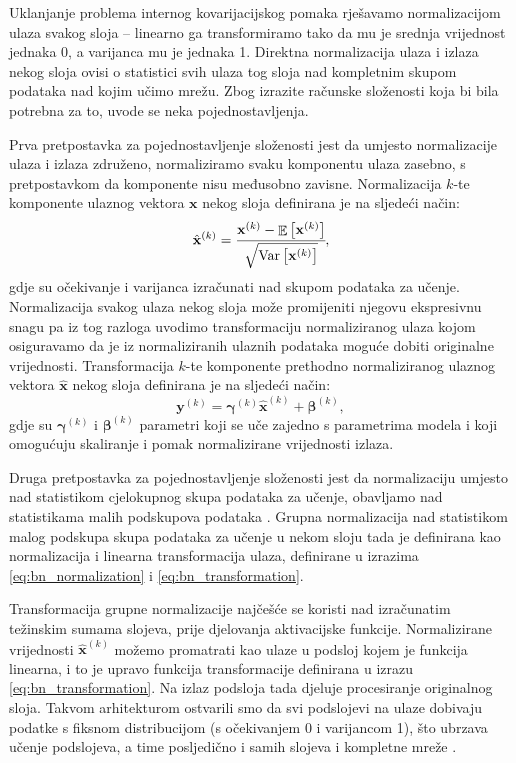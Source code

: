 \documentclass[times, utf8, diplomski, numeric]{fer}
\begin{document}
Uklanjanje problema internog kovarijacijskog pomaka rješavamo normalizacijom ulaza svakog sloja -- linearno ga transformiramo tako da mu je srednja vrijednost jednaka 0, a varijanca mu je jednaka 1.
Direktna normalizacija ulaza i izlaza nekog sloja ovisi o statistici svih ulaza tog sloja nad kompletnim skupom podataka nad kojim učimo mrežu.
Zbog izrazite računske složenosti koja bi bila potrebna za to, uvode se neka pojednostavljenja.

Prva pretpostavka za pojednostavljenje složenosti jest da umjesto normalizacije ulaza i izlaza združeno, normaliziramo svaku komponentu ulaza zasebno, s pretpostavkom da komponente nisu međusobno zavisne.
Normalizacija $k$-te komponente ulaznog vektora $\mathbf{x}$ nekog sloja definirana je na sljedeći način:
\begin{equation}
 \hat{\mathbf{x}}^{(k)} = \cfrac{\mathbf{x}^{(k)} - \mathop{\mathbb{E}} \left[ \mathbf{x}^{(k)} \right]} {\sqrt{ \mathrm{Var} \left[ \mathbf{x}^{(k)} \right] } }, \label{eq:bn_normalization}
\end{equation}
gdje su očekivanje i varijanca izračunati nad skupom podataka za učenje.
Normalizacija svakog ulaza nekog sloja može promijeniti njegovu ekspresivnu snagu pa iz tog razloga uvodimo transformaciju normaliziranog ulaza kojom osiguravamo da je iz normaliziranih ulaznih podataka moguće dobiti originalne vrijednosti.
Transformacija $k$-te komponente prethodno normaliziranog ulaznog vektora $\hat{\mathbf{x}}$ nekog sloja definirana je na sljedeći način:
\begin{equation}
 \mathbf{y}^{(k)} = \boldsymbol{\gamma}^{(k)} \hat{\mathbf{x}}^{(k)} + \boldsymbol{\beta}^{(k)}, \label{eq:bn_transformation}
\end{equation}
gdje su $\boldsymbol{\gamma}^{(k)}$ i $\boldsymbol{\beta}^{(k)}$ parametri koji se uče zajedno s parametrima modela i koji omogućuju skaliranje i pomak normalizirane vrijednosti izlaza.

Druga pretpostavka za pojednostavljenje složenosti jest da normalizaciju umjesto nad statistikom cjelokupnog skupa podataka za učenje, obavljamo nad statistikama malih podskupova podataka .
Grupna normalizacija nad statistikom malog podskupa skupa podataka za učenje u nekom sloju tada je definirana kao normalizacija i linearna transformacija ulaza, definirane u izrazima \ref{eq:bn_normalization} i \ref{eq:bn_transformation}.

Transformacija grupne normalizacije najčešće se koristi nad izračunatim težinskim sumama slojeva, prije djelovanja aktivacijske funkcije.
Normalizirane vrijednosti $\hat{\mathbf{x}}^{(k)}$ možemo promatrati kao ulaze u podsloj kojem je funkcija linearna, i to je upravo funkcija transformacije definirana u izrazu \ref{eq:bn_transformation}.
Na izlaz podsloja tada djeluje procesiranje originalnog sloja. 
Takvom arhitekturom ostvarili smo da svi podslojevi na ulaze dobivaju podatke s fiksnom distribucijom (s očekivanjem 0 i varijancom 1), što ubrzava učenje podslojeva, a time posljedično i samih slojeva i kompletne mreže \citep{article:bn_paper} \citep{seminar:rela}.
\end{document}
